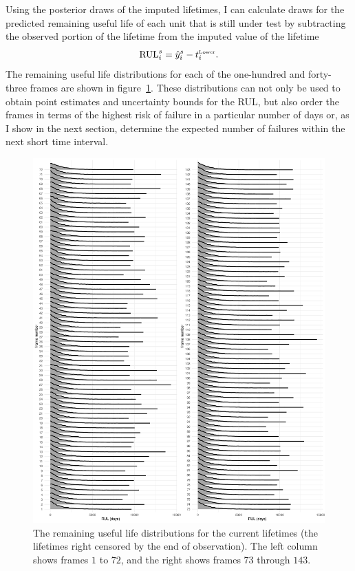 Using the posterior draws of the imputed lifetimes, I can calculate draws for the predicted remaining useful life of each unit that is still under test by subtracting the observed portion of the lifetime from the imputed value of the lifetime \marginnote{\small{\textcolor{red}{Ask Aloke how best to express this.}}}
\begin{equation} \label{eq:idler-rul}
  \hbox{RUL}^s_i  = \hat{y}_{i}^s - t^{\hbox{\tiny{Lower}}}_i.
\end{equation}
The remaining useful life distributions for each of the one-hundred and forty-three frames are shown in figure~\ref{fig:idler-FTs}. These distributions can not only be used to obtain point estimates and uncertainty bounds for the RUL, but also order the frames in terms of the highest risk of failure in a particular number of days or, as I show in the next section, determine the expected number of failures within the next short time interval.

\begin{figure}
  \centering
  \includegraphics[width=1\textwidth]{./figures/ch-3/posterior-FTs.pdf}
  \caption{The remaining useful life distributions for the current lifetimes (the lifetimes right censored by the end of observation). The left column shows frames $1$ to $72$, and the right shows frames $73$ through $143$.}
  \label{fig:idler-FTs}
\end{figure}


